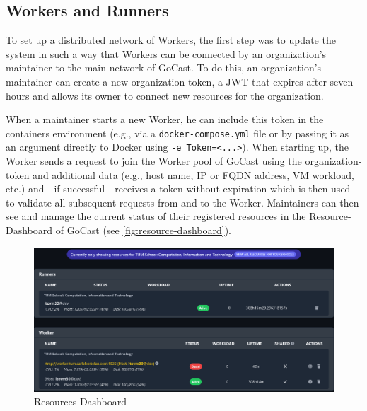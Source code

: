 \subsection{Workers and Runners}
To set up a distributed network of Workers, the first step was to update the system in such a way that Workers can be connected by an organization's maintainer to the main network of GoCast. To do this, an organization's maintainer can create a new organization-token, a \ac{JWT} that expires after seven hours and allows its owner to connect new resources for the organization. %


When a maintainer starts a new Worker, he can include this token in the containers environment (e.g., via a \texttt{docker-compose.yml} file or by passing it as an argument directly to Docker using \texttt{-e Token=<...>}). When starting up, the Worker sends a request to join the Worker pool of GoCast using the organization-token and additional data (e.g., host name, IP or FQDN address, \ac{VM} workload, etc.) and - if successful - receives a token without expiration which is then used to validate all subsequent requests from and to the Worker. Maintainers can then see and manage the current status of their registered resources in the Resource-Dashboard of GoCast (see \autoref{fig:resource-dashboard}).

\begin{figure}[htpb]
    \centering
    \includegraphics[width=390pt]{images/ResourceDashboard.png}
    \caption[Resources Dashboard]{Resources Dashboard}\label{fig:resource-dashboard}
\end{figure}


